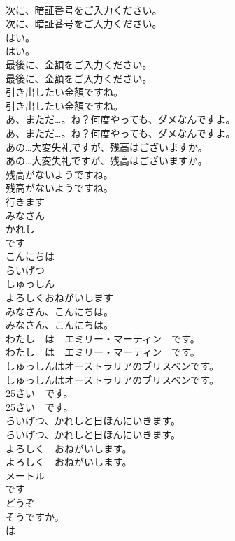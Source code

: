 \documentclass[8pt]{extreport}
\begin{document}
\begin{CJK}{UTF8}{min}
\\	次に、暗証番号をご入力ください。	
\\	次に、暗証番号をご入力ください。 
\\	はい。	
\\	はい。 
\\	最後に、金額をご入力ください。	
\\	最後に、金額をご入力ください。 
\\	引き出したい金額ですね。	
\\	引き出したい金額ですね。 
\\	あ、まただ…。ね？何度やっても、ダメなんですよ。	
\\	あ、まただ…。ね？何度やっても、ダメなんですよ。 
\\	あの…大変失礼ですが、残高はございますか。	
\\	あの…大変失礼ですが、残高はございますか。 
\\	残高がないようですね。	
\\	残高がないようですね。 
\\	行きます
\\	みなさん
\\	かれし
\\	です
\\	こんにちは
\\	らいげつ
\\	しゅっしん
\\	よろしくおねがいします
\\	みなさん、こんにちは。	
\\	みなさん、こんにちは。 
\\	わたし　は　エミリー・マーティン　です。	
\\	わたし　は　エミリー・マーティン　です。 
\\	しゅっしんはオーストラリアのブリスベンです。	
\\	しゅっしんはオーストラリアのブリスベンです。 
\\	25さい　です。	
\\	25さい　です。 
\\	らいげつ、かれしと日ほんにいきます。	
\\	らいげつ、かれしと日ほんにいきます。 
\\	よろしく　おねがいします。	
\\	よろしく　おねがいします。 
\\	メートル
\\	です
\\	どうぞ
\\	そうですか。
\\	は

\end{CJK}
\end{document}
